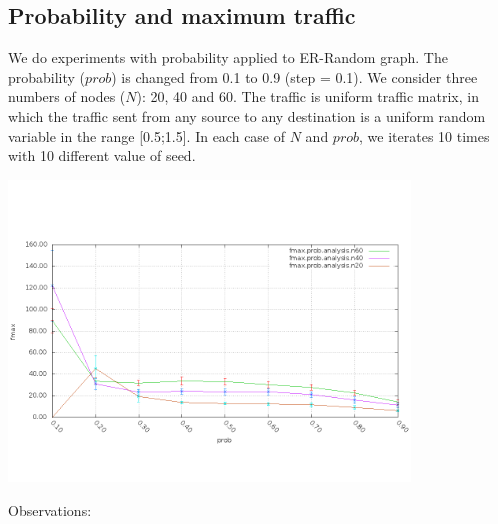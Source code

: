 \documentclass[a4paper]{article}
\begin{document}
  \subsection{Probability and maximum traffic}
  We do experiments with probability applied to ER-Random graph. The probability ($prob$) is changed from 0.1 to 0.9 (step = 0.1). We consider three numbers of nodes ($N$): 20, 40 and 60. The traffic is uniform traffic matrix, in which the traffic sent from any source to any destination is a uniform random variable in the range [0.5;1.5]. In each case of $N$ and $prob$, we iterates 10 times with 10 different value of seed.
    \begin{center}
    \includegraphics[width=0.8\textwidth]{random-ring-results/plot_pl_f.png}
    \label{fig:plot-pl-f}
    \end{center}
    Observations:
\end{document}
